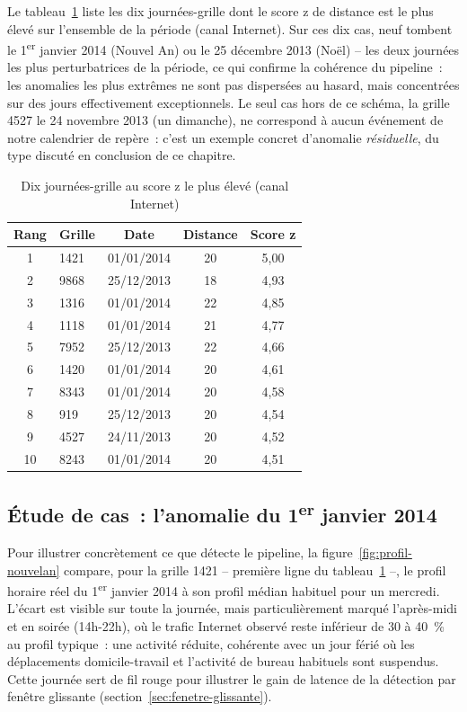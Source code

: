 Le tableau~\ref{tab:top-anomalies} liste les dix journées-grille dont
le score z de distance est le plus élevé sur l'ensemble de la période
(canal Internet). Sur ces dix cas, neuf tombent le
1\textsuperscript{er} janvier 2014 (Nouvel An) ou le 25 décembre 2013
(Noël) -- les deux journées les plus perturbatrices de la période, ce
qui confirme la cohérence du pipeline~: les anomalies les plus
extrêmes ne sont pas dispersées au hasard, mais concentrées sur des
jours effectivement exceptionnels. Le seul cas hors de ce schéma, la
grille 4527 le 24 novembre 2013 (un dimanche), ne correspond à aucun
événement de notre calendrier de repère~: c'est un exemple concret
d'anomalie \emph{résiduelle}, du type discuté en conclusion de ce
chapitre.

\begin{table}[htbp]
  \centering
  \caption{Dix journées-grille au score z le plus élevé (canal Internet)}
  \label{tab:top-anomalies}
  \begin{tabular}{clccc}
    \toprule
    \textbf{Rang} & \textbf{Grille} & \textbf{Date} & \textbf{Distance} & \textbf{Score z} \\
    \midrule
    1  & 1421 & 01/01/2014 & 20 & 5,00 \\
    2  & 9868 & 25/12/2013 & 18 & 4,93 \\
    3  & 1316 & 01/01/2014 & 22 & 4,85 \\
    4  & 1118 & 01/01/2014 & 21 & 4,77 \\
    5  & 7952 & 25/12/2013 & 22 & 4,66 \\
    6  & 1420 & 01/01/2014 & 20 & 4,61 \\
    7  & 8343 & 01/01/2014 & 20 & 4,58 \\
    8  & 919  & 25/12/2013 & 20 & 4,54 \\
    9  & 4527 & 24/11/2013 & 20 & 4,52 \\
    10 & 8243 & 01/01/2014 & 20 & 4,51 \\
    \bottomrule
  \end{tabular}
\end{table}

\subsection{Étude de cas~: l'anomalie du 1\textsuperscript{er} janvier 2014}

Pour illustrer concrètement ce que détecte le pipeline, la
figure~\ref{fig:profil-nouvelan} compare, pour la grille 1421 --
première ligne du tableau~\ref{tab:top-anomalies} --, le profil
horaire réel du 1\textsuperscript{er} janvier 2014 à son profil
médian habituel pour un mercredi. L'écart est visible sur toute la
journée, mais particulièrement marqué l'après-midi et en soirée
(14h-22h), où le trafic Internet observé reste inférieur de 30 à
40~\% au profil typique~: une activité réduite, cohérente avec un
jour férié où les déplacements domicile-travail et l'activité de
bureau habituels sont suspendus. Cette journée sert de fil rouge pour
illustrer le gain de latence de la détection par fenêtre glissante
(section~\ref{sec:fenetre-glissante}).

